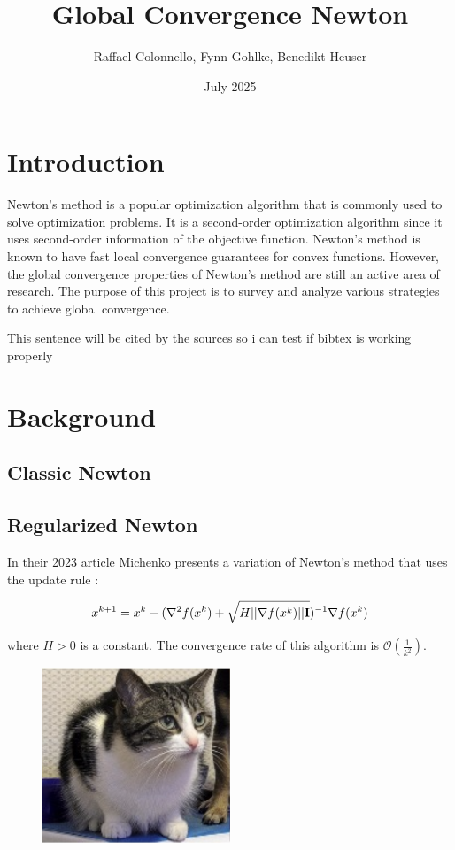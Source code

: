 \documentclass{article}
\title{Global Convergence Newton}
\author{Raffael Colonnello, Fynn Gohlke, Benedikt Heuser}
\date{July 2025}
\begin{document}
\maketitle

\section{Introduction}

Newton's method is a popular optimization algorithm that is commonly used to solve optimization
problems. It is a second-order optimization algorithm since it uses second-order information of the
objective function. Newton's method is known to have fast local convergence guarantees for convex
functions. However, the global convergence properties of Newton's method are still an active area of
research. The purpose of this project is to survey and analyze various strategies to achieve global
convergence.

This sentence will be cited by the sources so i can test if bibtex is working properly \cite{hanzely2022damped} 

\section{Background}

\subsection{Classic Newton}

\subsection{Regularized Newton}

In their 2023 article Michenko presents a variation of Newton's method that uses the update rule \cite{mishchenko2023regularized}:

\begin{equation}
  x^{k+1} = x^{k} - ( \nabla^2 f(x^k) + \sqrt{H||\nabla f(x^k)||\bold{I}})^{-1} \nabla f(x^k)
  \label{eq:regularized-newton}
\end{equation}

where $H > 0$ is a constant. The convergence rate of this algorithm is $\mathcal{O}(\frac{1}{k^2})$.




\begin{figure}
  \begin{center}
    \includegraphics[width=0.5\textwidth]{figures/cat.png}
  \end{center}
  \caption{}\label{fig:}
\end{figure}
\end{document}
